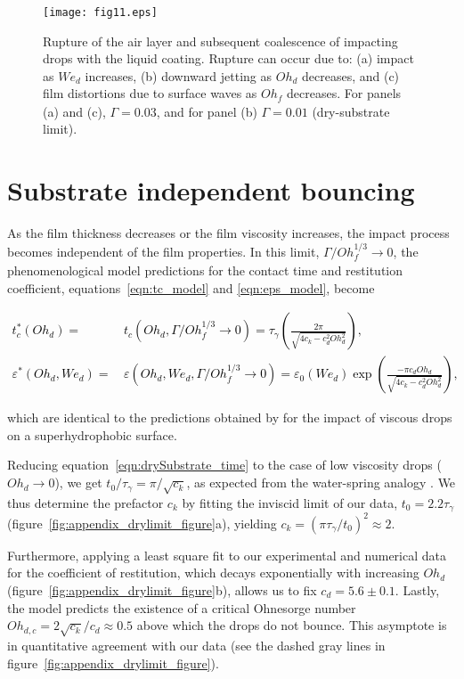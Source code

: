 \documentclass[]{jfm}
\newcommand{\revRev}[1]{\textcolor{black}{#1}}
\newcommand{\Ohd}{\mathit{Oh}_\mathit{d}}
\newcommand{\Ohf}{\mathit{Oh}_\mathit{f}}
\newcommand{\Wen}{\mathit{We}_\mathit{d}}
\begin{document}
\begin{figure}
	\centering
	\texttt{[image: fig11.eps]}
	\caption{Rupture of the air layer and subsequent coalescence of impacting drops with the liquid coating. 
		Rupture can occur due to: (a) impact as $\Wen$ increases, (b) downward jetting as $\Ohd$ decreases, and (c) film distortions due to surface waves as $\Ohf$ decreases. 
		For panels (a) and (c), $\Gamma = 0.03$, and for panel (b) $\Gamma = 0.01$ (dry-substrate limit).}
	\label{fig:figureA1}
\end{figure}

\section{Substrate independent bouncing}
\label{app:SubstrateIndependentBouncing}

As the film thickness decreases or the film viscosity increases, the impact process becomes independent of the film properties. 
In this limit, $\Gamma/\Ohf^{1/3} \to 0$, the phenomenological model predictions for the contact time and restitution coefficient, equations~\eqref{eqn:tc_model} and \eqref{eqn:eps_model}, become

\revRev{\begin{align}
		\label{eqn:drySubstrate_time}
		t_c^*(\Ohd) =\,&t_c(\Ohd, \Gamma/\Ohf^{1/3} \to 0) = \tau_\gamma\left(\frac{2\pi}{\sqrt{4c_{k} - c_{d}^{2} \Ohd^{2}}}\right),\\
		\label{eqn:drySubstrate_epsilon}
		\varepsilon^*(\Ohd, \Wen) =\,&\varepsilon(\Ohd, \Wen, \Gamma/\Ohf^{1/3} \to 0) = \varepsilon_0(\Wen)\exp\left( \frac{-\pi c_{d} \Ohd}{\sqrt{4c_{k} - c_{d}^{2} \Ohd^{2}}} \right),
\end{align}}

\noindent which are identical to the predictions obtained by \citet{jha2020viscous} for the impact of viscous drops on a superhydrophobic surface. 

Reducing equation~\eqref{eqn:drySubstrate_time} to the case of low viscosity drops ($\Ohd \to 0$), we get $t_0/\tau_\gamma = \pi/\sqrt{c_k}$, as expected from the water-spring analogy \citep{richard2002contact, okumura2003water}.
We thus determine the prefactor $c_k$ by fitting the inviscid limit of our data, $t_0 = 2.2\tau_\gamma$ (figure~\ref{fig:appendix_drylimit_figure}a), yielding $c_k = \left(\pi\tau_\gamma/t_0\right)^2 \approx 2$.

Furthermore, applying a least square fit to our experimental and numerical data for the coefficient of restitution, which decays exponentially with increasing $\Ohd$ (figure~\ref{fig:appendix_drylimit_figure}b), allows us to fix $c_d = 5.6 \pm 0.1$. Lastly, the model predicts the existence of a critical Ohnesorge number $Oh_{d,c} = 2\sqrt{c_k}/c_d \approx 0.5$ above which the drops do not bounce. This asymptote is in quantitative agreement with our data (see the dashed gray lines in figure~\ref{fig:appendix_drylimit_figure}).  
\end{document}
